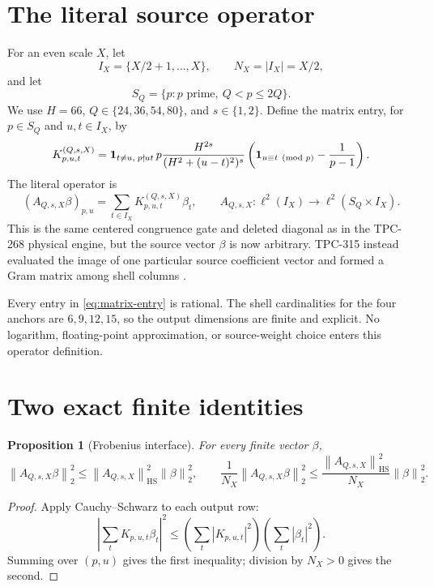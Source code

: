 \documentclass[10pt,a4paper]{article}
\newtheorem{proposition}{Proposition}
\newcommand{\HS}{\operatorname{HS}}
\newcommand{\norm}[1]{\left\lVert #1\right\rVert}
\begin{document}
\section{The literal source operator}

For an even scale $X$, let
\[
 I_X=\{X/2+1,\ldots,X\},\qquad N_X=|I_X|=X/2,
\]
and let
\[
 S_Q=\{p: p\text{ prime},\ Q<p\leq 2Q\}.
\]
We use $H=66$, $Q\in\{24,36,54,80\}$, and $s\in\{1,2\}$.  Define the
matrix entry, for $p\in S_Q$ and $u,t\in I_X$, by
\begin{equation}
 K_{p,u,t}^{(Q,s,X)}=
 {\bf 1}_{t\neq u,\;p\nmid ut}\,p
 \frac{H^{2s}}{(H^2+(u-t)^2)^s}
 \left({\bf 1}_{u\equiv t\pmod p}-\frac1{p-1}\right).
 \label{eq:matrix-entry}
\end{equation}
The literal operator is
\begin{equation}
 (A_{Q,s,X}\beta)_{p,u}=
 \sum_{t\in I_X}K_{p,u,t}^{(Q,s,X)}\beta_t,
 \qquad
 A_{Q,s,X}:\ell^2(I_X)\longrightarrow
 \ell^2(S_Q\times I_X).
 \label{eq:operator}
\end{equation}
This is the same centered congruence gate and deleted diagonal as in the
TPC-268 physical engine, but the source vector $\beta$ is now arbitrary.
TPC-315 instead evaluated the image of one particular source coefficient
vector and formed a Gram matrix among shell columns \cite{tpc315}.

Every entry in \eqref{eq:matrix-entry} is rational.  The shell cardinalities
for the four anchors are $6,9,12,15$, so the output dimensions are finite and
explicit.  No logarithm, floating-point approximation, or source-weight
choice enters this operator definition.

\section{Two exact finite identities}

\begin{proposition}[Frobenius interface]
For every finite vector $\beta$,
\begin{equation}
 \norm{A_{Q,s,X}\beta}_2^2
 \leq \norm{A_{Q,s,X}}_{\HS}^2\norm{\beta}_2^2,
 \qquad
 \frac1{N_X}\norm{A_{Q,s,X}\beta}_2^2
 \leq \frac{\norm{A_{Q,s,X}}_{\HS}^2}{N_X}\norm{\beta}_2^2.
 \label{eq:frobenius}
\end{equation}
\end{proposition}

\begin{proof}
Apply Cauchy--Schwarz to each output row:
\[
 \left|\sum_t K_{p,u,t}\beta_t\right|^2
 \leq \left(\sum_t|K_{p,u,t}|^2\right)
       \left(\sum_t|\beta_t|^2\right).
\]
Summing over $(p,u)$ gives the first inequality; division by $N_X>0$ gives
the second.
\end{proof}
\end{document}

